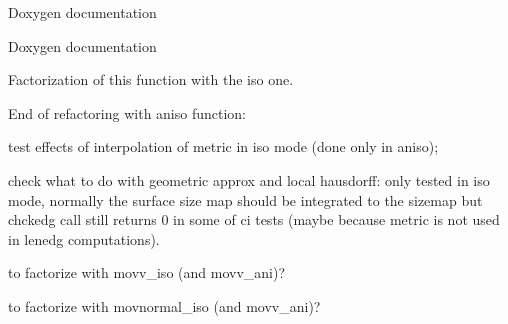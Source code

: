 \begin{DoxyRefList}
\label{todo__todo000024}%
%
Doxygen documentation  
\item[File \mbox{\hyperlink{mmg3d3_8c}{mmg3d3.c}} ]\label{todo__todo000026}%
%
Doxygen documentation  
\item[Global \mbox{\hyperlink{anisomovpt__3d_8c_aadafe91b6aa3b3ca2eddeb3f992f8a29}{MMG3\+D\+\_\+movbdycurvept\+\_\+ani}} (MMG5\+\_\+p\+Mesh mesh, MMG5\+\_\+p\+Sol met, MMG3\+D\+\_\+p\+PROctree PROctree, int64\+\_\+t $\ast$listv, int ilistv, MMG5\+\_\+int $\ast$lists, int ilists, int improve, const uint16\+\_\+t edg\+Tag)]\label{todo__todo000013}%
%
Factorization of this function with the iso one.  
\item[Global \mbox{\hyperlink{movpt__3d_8c_a8bd9de0189d8e0652c3c7e47daa8d50c}{MMG3\+D\+\_\+movbdycurvept\+\_\+iso}} (MMG5\+\_\+p\+Mesh mesh, MMG5\+\_\+p\+Sol met, MMG3\+D\+\_\+p\+PROctree PROctree, int64\+\_\+t $\ast$listv, int ilistv, MMG5\+\_\+int $\ast$lists, int ilists, int improve, const int16\+\_\+t edg\+Tag)]\label{todo__todo000028}%
%
End of refactoring with aniso function\+:
\begin{DoxyItemize}
\item test effects of interpolation of metric in iso mode (done only in aniso);
\item check what to do with geometric approx and local hausdorff\+: only tested in iso mode, normally the surface size map should be integrated to the sizemap but chckedg call still returns 0 in some of ci tests (maybe because metric is not used in lenedg computations).  
\end{DoxyItemize}
\item[Global \mbox{\hyperlink{movpt__3d_8c_a1bb3470119319330106e3bd6f7275f1e}{MMG3\+D\+\_\+movnormal\+\_\+iso}} (MMG5\+\_\+p\+Mesh mesh, MMG5\+\_\+p\+Sol sol, MMG5\+\_\+int k, int ib)]\label{todo__todo000029}%
%
to factorize with movv\+\_\+iso (and movv\+\_\+ani)?  
\item[Global \mbox{\hyperlink{movpt__3d_8c_aadb5d7c16c2ca86cc5cc950a76ab24c6}{MMG3\+D\+\_\+movv\+\_\+iso}} (MMG5\+\_\+p\+Mesh mesh, MMG5\+\_\+p\+Sol sol, MMG5\+\_\+int k, int ib)]\label{todo__todo000030}%
%
to factorize with movnormal\+\_\+iso (and movv\+\_\+ani)?  
\item[Global \mbox{\hyperlink{quality__3d_8c_a9ca1aba7ffb80ae15c740d63be629f7c}{MMG5\+\_\+caltet33\+\_\+ani}} (MMG5\+\_\+p\+Mesh mesh, MMG5\+\_\+p\+Sol met, MMG5\+\_\+p\+Tetra pt)]\label{todo__todo000031}%

\end{DoxyRefList}
